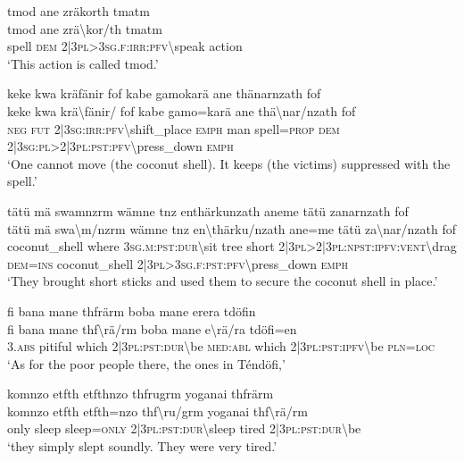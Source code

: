 \ea\label{ex:5:a1545}
tmod ane zräkorth tmatm\\
\gll tmod	ane	zrä{\textbackslash}kor/th	tmatm\\
     spell	\textsc{dem}	2|3\textsc{pl}>3\textsc{sg}.\textsc{f}:\textsc{irr}:\textsc{pfv}{\textbackslash}speak	action\\
\glt `This action is called tmod.'
\z

\ea\label{ex:5:a1546}
keke kwa kräfänir fof kabe gamokarä ane thänarnzath fof\\
\gll keke	kwa	krä{\textbackslash}fänir/	fof	kabe	gamo=karä	ane	thä{\textbackslash}nar/nzath	fof\\
     \textsc{neg}	\textsc{fut}	2|3\textsc{sg}:\textsc{irr}:\textsc{pfv}{\textbackslash}shift\_place	\textsc{emph}	man	spell=\textsc{prop}	\textsc{dem}	2|3\textsc{sg}:\textsc{pl}>2|3\textsc{pl}:\textsc{pst}:\textsc{pfv}{\textbackslash}press\_down	\textsc{emph}\\
\glt `One cannot move (the coconut shell). It keeps (the victims) suppressed with the spell.'
\z

\ea\label{ex:5:a1548}
tätü mä swamnzrm wämne tnz enthärkunzath aneme tätü zanarnzath fof\\
\gll tätü	mä	swa{\textbackslash}m/nzrm	wämne	tnz	en{\textbackslash}thärku/nzath	ane=me	tätü	za{\textbackslash}nar/nzath	fof\\
     coconut\_shell	where	3\textsc{sg}.\textsc{m}:\textsc{pst}:\textsc{dur}{\textbackslash}sit	tree	short	2|3\textsc{pl}>2|3\textsc{pl}:\textsc{npst}:\textsc{ipfv}:\textsc{vent}{\textbackslash}drag	\textsc{dem}=\textsc{ins}	coconut\_shell	2|3\textsc{pl}>3\textsc{sg}.\textsc{f}:\textsc{pst}:\textsc{pfv}{\textbackslash}press\_down	\textsc{emph}\\
\glt `They brought short sticks and used them to secure the coconut shell in place.'
\z

\ea\label{ex:5:a1550}
fi bana mane thfrärm boba mane erera tdöfin\\
\gll fi	bana	mane	thf{\textbackslash}rä/rm	boba	mane	e{\textbackslash}rä/ra	tdöfi=en\\
     3.\textsc{abs}	pitiful	which	2|3\textsc{pl}:\textsc{pst}:\textsc{dur}{\textbackslash}be	\textsc{med}:\textsc{abl}	which	2|3\textsc{pl}:\textsc{pst}:\textsc{ipfv}{\textbackslash}be	\textsc{pln}=\textsc{loc}\\
\glt `As for the poor people there, the ones in Téndöfi,'
\z

\ea\label{ex:5:a1551}
komnzo etfth etfthnzo thfrugrm yoganai thfrärm\\
\gll komnzo	etfth	etfth=nzo	thf{\textbackslash}ru/grm	yoganai	thf{\textbackslash}rä/rm\\
     only	sleep	sleep=\textsc{only}	2|3\textsc{pl}:\textsc{pst}:\textsc{dur}{\textbackslash}sleep	tired	2|3\textsc{pl}:\textsc{pst}:\textsc{dur}{\textbackslash}be\\
\glt `they simply slept soundly. They were very tired.'
\z

